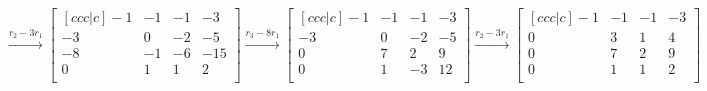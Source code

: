 \documentclass[12pt]{article}
\begin{document}
$$
\overset{r_2-3r_1}{\longrightarrow}
\begin{bmatrix}[ccc|c]
   -1 & -1 & -1 & -3 \\
   -3 & 0 & -2 & -5 \\
   -8 & -1 & -6 & -15 \\
  0 & 1 & 1 & 2 \\
\end{bmatrix} \overset{r_3-8r_1}{\longrightarrow}
\begin{bmatrix}[ccc|c]
   -1 & -1 & -1 & -3 \\
   -3 & 0 & -2 & -5 \\
   0 & 7 & 2 & 9 \\
   0 & 1 & -3 & 12 \\
\end{bmatrix} \overset{r_2-3r_1}{\longrightarrow}
\begin{bmatrix}[ccc|c]
   -1 & -1 & -1 & -3 \\
   0 & 3 & 1 & 4\\
   0 & 7 & 2 & 9 \\
   0 & 1 & 1 & 2 \\
\end{bmatrix}
$$
\end{document}
